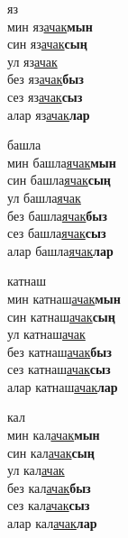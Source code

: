 \begin{multicols}{4}
\begin{enumerate}
\begin{minipage}{\linewidth}
    \item
    яз\\
    мин яз\underline{ачак}\textbf{мын}\\
    син яз\underline{ачак}\textbf{сың}\\
    ул яз\underline{ачак}\\
    без яз\underline{ачак}\textbf{быз}\\
    сез яз\underline{ачак}\textbf{сыз}\\
    алар яз\underline{ачак}\textbf{лар}\\
\end{minipage}

\begin{minipage}{\linewidth}
    \item
    башла\\
    мин башла\underline{ячак}\textbf{мын}\\
    син башла\underline{ячак}\textbf{сың}\\
    ул башла\underline{ячак}\\
    без башла\underline{ячак}\textbf{быз}\\
    сез башла\underline{ячак}\textbf{сыз}\\
    алар башла\underline{ячак}\textbf{лар}\\
\end{minipage}

\begin{minipage}{\linewidth}
    \item
    катнаш\\
    мин катнаш\underline{ачак}\textbf{мын}\\
    син катнаш\underline{ачак}\textbf{сың}\\
    ул катнаш\underline{ачак}\\
    без катнаш\underline{ачак}\textbf{быз}\\
    сез катнаш\underline{ачак}\textbf{сыз}\\
    алар катнаш\underline{ачак}\textbf{лар}\\
\end{minipage}

\begin{minipage}{\linewidth}
    \item
    кал\\
    мин кал\underline{ачак}\textbf{мын}\\
    син кал\underline{ачак}\textbf{сың}\\
    ул кал\underline{ачак}\\
    без кал\underline{ачак}\textbf{быз}\\
    сез кал\underline{ачак}\textbf{сыз}\\
    алар кал\underline{ачак}\textbf{лар}\\
\end{minipage}


\end{enumerate}
\end{multicols}
